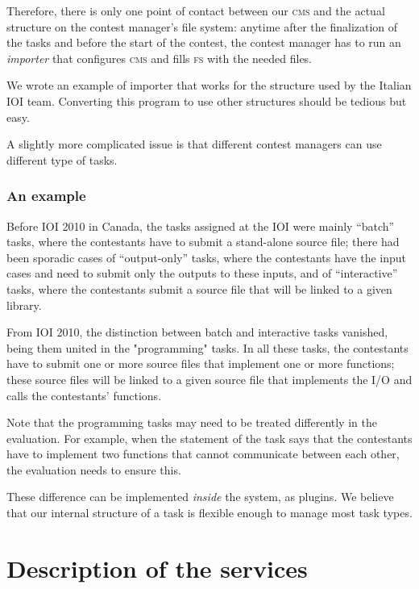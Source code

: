 \documentclass[a4paper,8pt]{amsart}
\newcommand{\CMS}{\textsc{cms}}
\newcommand{\FS}{\textsc{fs}}
\begin{document}
\begin{multicols}{2}
  Therefore, there is only one point of contact between our \CMS{} and
  the actual structure on the contest manager's file system: anytime
  after the finalization of the tasks and before the start of the
  contest, the contest manager has to run an \emph{importer\/} that
  configures \CMS{} and fills \FS{} with the needed files.

  We wrote an example of importer that works for the structure used by
  the Italian IOI team. Converting this program to use other
  structures should be tedious but easy.

  A slightly more complicated issue is that different contest managers
  can use different type of tasks.

  \subsubsection{An example}

  Before IOI 2010 in Canada, the tasks assigned at the IOI were mainly
  ``batch'' tasks, where the contestants have to submit a stand-alone
  source file; there had been sporadic cases of ``output-only'' tasks,
  where the contestants have the input cases and need to submit only
  the outputs to these inputs, and of ``interactive'' tasks, where the
  contestants submit a source file that will be linked to a given
  library.

  From IOI 2010, the distinction between batch and interactive tasks
  vanished, being them united in the "programming" tasks. In all these
  tasks, the contestants have to submit one or more source files that
  implement one or more functions; these source files will be linked
  to a given source file that implements the I/O and calls the
  contestants' functions.

  Note that the programming tasks may need to be treated differently
  in the evaluation. For example, when the statement of the task says
  that the contestants have to implement two functions that cannot
  communicate between each other, the evaluation needs to ensure this.

  These difference can be implemented \emph{inside} the system, as
  plugins. We believe that our internal structure of a task is
  flexible enough to manage most task types.

  \section{Description of the services}


\end{multicols}
\end{document}
